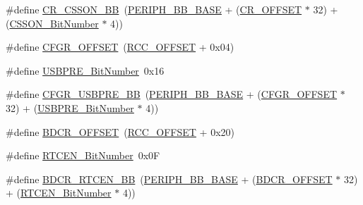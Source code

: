 \begin{DoxyCompactItemize}
\#define \hyperlink{group___r_c_c___private___defines_gaca914aed10477ae4090fea0a9639b1ea}{C\+R\+\_\+\+C\+S\+S\+O\+N\+\_\+\+BB}~(\hyperlink{group___peripheral__memory__map_gaed7efc100877000845c236ccdc9e144a}{P\+E\+R\+I\+P\+H\+\_\+\+B\+B\+\_\+\+B\+A\+SE} + (\hyperlink{group___r_c_c___private___defines_gafa1d3d0ea72132df651c76fc1bdffffc}{C\+R\+\_\+\+O\+F\+F\+S\+ET} $\ast$ 32) + (\hyperlink{group___r_c_c___private___defines_ga253fa44d87aabc55f0cd6628e77a51fd}{C\+S\+S\+O\+N\+\_\+\+Bit\+Number} $\ast$ 4))
\item 
\#define \hyperlink{group___r_c_c___private___defines_ga8682298330c3b9bae1992e4f1a0af985}{C\+F\+G\+R\+\_\+\+O\+F\+F\+S\+ET}~(\hyperlink{group___r_c_c___private___defines_ga539e07c3b3c55f1f1d47231341fb11e1}{R\+C\+C\+\_\+\+O\+F\+F\+S\+ET} + 0x04)
\item 
\#define \hyperlink{group___r_c_c___private___defines_gad758d602b6d2b93a04cb8ada87c20c82}{U\+S\+B\+P\+R\+E\+\_\+\+Bit\+Number}~0x16
\item 
\#define \hyperlink{group___r_c_c___private___defines_gabde4e60349b8412a79611c0aeb27c3a2}{C\+F\+G\+R\+\_\+\+U\+S\+B\+P\+R\+E\+\_\+\+BB}~(\hyperlink{group___peripheral__memory__map_gaed7efc100877000845c236ccdc9e144a}{P\+E\+R\+I\+P\+H\+\_\+\+B\+B\+\_\+\+B\+A\+SE} + (\hyperlink{group___r_c_c___private___defines_ga8682298330c3b9bae1992e4f1a0af985}{C\+F\+G\+R\+\_\+\+O\+F\+F\+S\+ET} $\ast$ 32) + (\hyperlink{group___r_c_c___private___defines_gad758d602b6d2b93a04cb8ada87c20c82}{U\+S\+B\+P\+R\+E\+\_\+\+Bit\+Number} $\ast$ 4))
\item 
\#define \hyperlink{group___r_c_c___private___defines_ga5f8a0c3cb5f5c835bf7eef09515138ad}{B\+D\+C\+R\+\_\+\+O\+F\+F\+S\+ET}~(\hyperlink{group___r_c_c___private___defines_ga539e07c3b3c55f1f1d47231341fb11e1}{R\+C\+C\+\_\+\+O\+F\+F\+S\+ET} + 0x20)
\item 
\#define \hyperlink{group___r_c_c___private___defines_ga9302c551752124766afc4cee65436405}{R\+T\+C\+E\+N\+\_\+\+Bit\+Number}~0x0F
\item 
\#define \hyperlink{group___r_c_c___private___defines_gaf70aaf70b0752ccb3a60307b2fb46038}{B\+D\+C\+R\+\_\+\+R\+T\+C\+E\+N\+\_\+\+BB}~(\hyperlink{group___peripheral__memory__map_gaed7efc100877000845c236ccdc9e144a}{P\+E\+R\+I\+P\+H\+\_\+\+B\+B\+\_\+\+B\+A\+SE} + (\hyperlink{group___r_c_c___private___defines_ga5f8a0c3cb5f5c835bf7eef09515138ad}{B\+D\+C\+R\+\_\+\+O\+F\+F\+S\+ET} $\ast$ 32) + (\hyperlink{group___r_c_c___private___defines_ga9302c551752124766afc4cee65436405}{R\+T\+C\+E\+N\+\_\+\+Bit\+Number} $\ast$ 4))
\item 

\end{DoxyCompactItemize}
